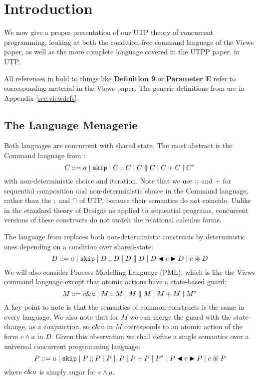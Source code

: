 \section{Introduction}\label{sec:intro}

We now give a proper presentation of our UTP theory
of concurrent programming, looking at both the condition-free command language
of the Views paper\cite{conf/popl/Dinsdale-YoungBGPY13},
as well as the more complete language covered in the UTPP paper\cite{DBLP:conf/icfem/WoodcockH02}.
in UTP.

All references in bold to things
like \textbf{Definition 9} or \textbf{Parameter E} refer to corresponding material
in the Views paper.
The generic definitions from\cite{conf/popl/Dinsdale-YoungBGPY13}
are in Appendix \ref{sec:viewdefs}.

\subsection{The Language Menagerie}

Both languages are concurrent with shared state.
The most abstract is the Command language from \cite{conf/popl/Dinsdale-YoungBGPY13}:
\[
 C ::= a \mid \texttt{skip} \mid C \mathbin{;\!;} C \mid C \parallel C \mid C+C \mid C^*
\]
with non-deterministic choice and iteration.
Note that we use $\mathbin{;\!;}$ and $+$ for sequential composition
and non-deterministic choice in the Command language,
rather than the $;$ and $\sqcap$ of UTP,
because their semantics do not coincide.
Unlike in the standard theory of Designs as applied to sequential programs,
concurrent versions of these constructs do not match the relational
calculus forms.


The language from \cite{DBLP:conf/icfem/WoodcockH02} replaces both
non-deterministic constructs by deterministic ones depending
on a condition over shared-state:
\[
 D ::= a \mid \texttt{skip} \mid D \mathbin{;\!;} D \mid D \parallel D \mid D \mathrel{\blacktriangleleft{c}\blacktriangleright} D \mid c \mathrel{\circledast} D
\]
We will also consider Process Modelling Language
(PML)\cite{DBLP:journals/infsof/AtkinsonWN07},
which is like the Views command language except that atomic actions
have a state-based guard:
\[
 M ::= c \& a \mid M \mathbin{;\!;} M \mid M \parallel M \mid M+M \mid M^*
\]
A key point to note is that the semantics of common constructs is the same
in every language.
We also note that for $M$ we can merge the guard with the state-change,
as a conjunction, so $c \& a$ in $M$ corresponds to an atomic
action of the form $c \land a$ in $D$.
Given this observation we shall define a single semantics over
a universal concurrent programming language:
\[
 P ::= a \mid \texttt{skip} \mid P \mathbin{;\!;} P  \mid P \parallel P
   \mid P+P\mid P^*
   \mid P \mathrel{\blacktriangleleft{c}\blacktriangleright} P \mid c \mathrel{\circledast} P
\]
where $c \& a$ is simply sugar for $c \land a$.

